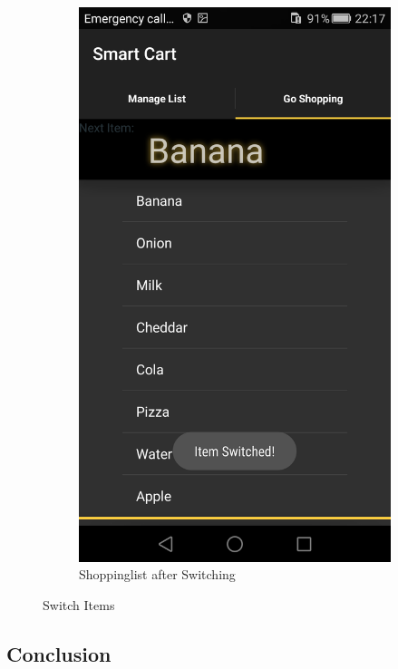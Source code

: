 \begin{figure}[h]
\begin{subfigure}{0.475\textwidth}
\centering
\includegraphics[height= 0.35\textheight]{res/usermanual/switched.png}
\caption{Shoppinglist after Switching}
\label{fig:afterSwitching}
\end{subfigure}
\caption{Switch Items}
\label{fig:checkItems}
\end{figure}

\FloatBarrier

\subsection{Conclusion}

